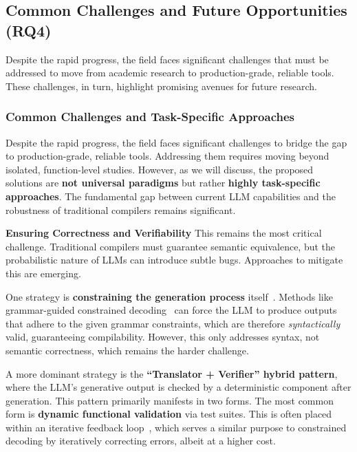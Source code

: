 \documentclass[pdflatex,sn-mathphys-ay,twocolumn, a4paper]{sn-jnl}%
\theoremstyle{thmstyleone}%
\theoremstyle{thmstyletwo}%
\theoremstyle{thmstylethree}%
\begin{document}
\subsection{Common Challenges and Future Opportunities (\textbf{RQ4})}

Despite the rapid progress, the field faces significant challenges that must be addressed to move from academic research to production-grade, reliable tools. These challenges, in turn, highlight promising avenues for future research.

\subsubsection{Common Challenges and Task-Specific Approaches}

Despite the rapid progress, the field faces significant challenges to bridge the gap to production-grade, reliable tools. Addressing them requires moving beyond isolated, function-level studies. However, as we will discuss, the proposed solutions are \textbf{not universal paradigms} but rather \textbf{highly task-specific approaches}. The fundamental gap between current LLM capabilities and the robustness of traditional compilers remains significant.

\textbf{Ensuring Correctness and Verifiability}
This remains the most critical challenge. Traditional compilers must guarantee semantic equivalence, but the probabilistic nature of LLMs can introduce subtle bugs. Approaches to mitigate this are emerging.

One strategy is \textbf{constraining the generation process} itself~\citep{typeconstrainedgeneration2025pldi}. Methods like grammar-guided constrained decoding~\citep{outlines2023arxiv,xgrammar2024arxiv} can force the LLM to produce outputs that adhere to the given grammar constraints, which are therefore \textit{syntactically} valid, guaranteeing compilability. However, this only addresses syntax, not semantic correctness, which remains the harder challenge.

A more dominant strategy is the \textbf{``Translator + Verifier'' hybrid pattern}, where the LLM's generative output is checked by a deterministic component after generation. This pattern primarily manifests in two forms. The most common form is \textbf{dynamic functional validation} via test suites. This is often placed within an iterative feedback loop~\citep{123_ye2024problem, 173_wong2025decllm}, which serves a similar purpose to constrained decoding by iteratively correcting errors, albeit at a higher cost.
\end{document}
